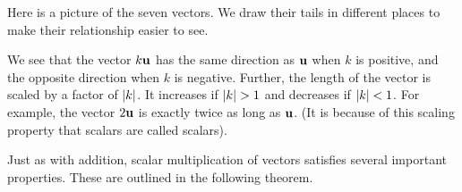 \begin{solution}
  Here is a picture of the seven vectors. We draw their tails in
  different places to make their relationship easier to see.
  \begin{center}
  \end{center}
  We see that the vector $k\vect{u}$ has the same direction as
  $\vect{u}$ when $k$ is positive, and the opposite direction when $k$
  is negative. Further, the length of the vector is scaled by a factor
  of $\left|k\right|$. It increases if $\abs{k}>1$ and decreases if
  $\left|k\right|<1$. For example, the vector $2\vect{u}$ is exactly twice as
  long as $\vect{u}$.  (It is because of this scaling property that
  scalars are called scalars).
\end{solution}

Just as with addition, scalar multiplication of vectors satisfies
several important properties. These are outlined in the following
theorem.

